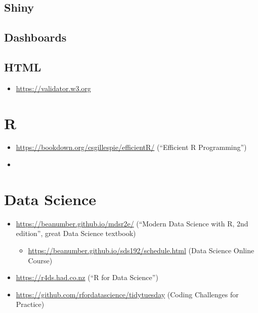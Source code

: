 \documentclass[
]{book}
\providecommand{\tightlist}{%
  \setlength{\itemsep}{0pt}\setlength{\parskip}{0pt}}
\begin{document}
\hypertarget{shiny}{%
\subsection{Shiny}\label{shiny}}

\hypertarget{dashboards}{%
\subsection{Dashboards}\label{dashboards}}

\hypertarget{html}{%
\subsection{HTML}\label{html}}

\begin{itemize}
\tightlist
\item
  \url{https://validator.w3.org}
\end{itemize}

\hypertarget{r}{%
\section{R}\label{r}}

\begin{itemize}
\item
  \url{https://bookdown.org/csgillespie/efficientR/} (``Efficient R Programming'')
\item
\end{itemize}

\hypertarget{data-science}{%
\section{Data Science}\label{data-science}}

\begin{itemize}
\tightlist
\item
  \url{https://beanumber.github.io/mdsr2e/} (``Modern Data Science with R, 2nd edition'', great Data Science textbook)

  \begin{itemize}
  \tightlist
  \item
    \url{https://beanumber.github.io/sds192/schedule.html} (Data Science Online Course)
  \end{itemize}
\item
  \url{https://r4ds.had.co.nz} (``R for Data Science'')
\item
  \url{https://github.com/rfordatascience/tidytuesday} (Coding Challenges for Practice)
\end{itemize}
\end{document}
